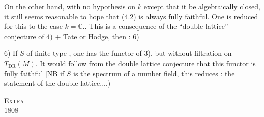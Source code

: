 On the other hand, with no hypothesis on $k$ except that it be \uline{algebraically closed}, it still seems reasonable to hope that (4.2) is always fully faithful.
One is reduced for this to the case $k=\mathbb C$.. This is a consequence of the ``double lattice'' conjecture of 4) $+$ Tate or Hodge, then : 6)

6) If $S$ of finite type , one has the functor of 3), but without filtration on $T_{\mathrm{DR}}(M)$. It would follow from the double lattice conjecture  that this functor is fully faithful
[\uline{NB} if $S$ is the spectrum of a number field, this reduces : the statement of the double lattice....)
\par\noindent\textsc{}\hfill\textsc{Extra}\\
 1808\hfill{}
